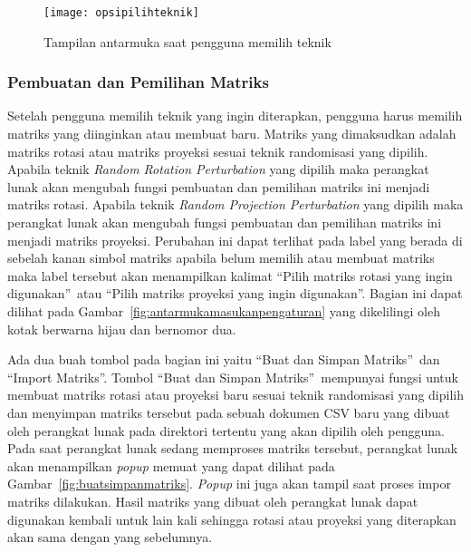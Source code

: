 \begin{figure}
	\centering
	\texttt{[image: opsipilihteknik]}
	\caption{Tampilan antarmuka saat pengguna memilih teknik}
	\label{fig:opsipilihteknik}
\end{figure}

\subsubsection{Pembuatan dan Pemilihan Matriks}
\label{subsubsec:pilihmatriks}

Setelah pengguna memilih teknik yang ingin diterapkan, pengguna harus memilih matriks yang diinginkan atau membuat baru. Matriks yang dimaksudkan adalah matriks rotasi atau matriks proyeksi sesuai teknik randomisasi yang dipilih. Apabila teknik \textit{Random Rotation Perturbation} yang dipilih maka perangkat lunak akan mengubah fungsi pembuatan dan pemilihan matriks ini menjadi matriks rotasi. Apabila teknik \textit{Random Projection Perturbation} yang dipilih maka perangkat lunak akan mengubah fungsi pembuatan dan pemilihan matriks ini menjadi matriks proyeksi. Perubahan ini dapat terlihat pada label yang berada di sebelah kanan simbol matriks apabila belum memilih atau membuat matriks maka label tersebut akan menampilkan kalimat \textquotedblleft Pilih matriks rotasi yang ingin digunakan\textquotedblright~atau \textquotedblleft Pilih matriks proyeksi yang ingin digunakan\textquotedblright. Bagian ini dapat dilihat pada Gambar~\ref{fig:antarmukamasukanpengaturan} yang dikelilingi oleh kotak berwarna hijau dan bernomor dua.

Ada dua buah tombol pada bagian ini yaitu \textquotedblleft Buat dan Simpan Matriks\textquotedblright~dan \textquotedblleft Import Matriks\textquotedblright. Tombol \textquotedblleft Buat dan Simpan Matriks\textquotedblright~mempunyai fungsi untuk membuat matriks rotasi atau proyeksi baru sesuai teknik randomisasi yang dipilih dan menyimpan matriks tersebut pada sebuah dokumen CSV baru yang dibuat oleh perangkat lunak pada direktori tertentu yang akan dipilih oleh pengguna. Pada saat perangkat lunak sedang memproses matriks tersebut, perangkat lunak akan menampilkan \textit{popup} memuat yang dapat dilihat pada Gambar~\ref{fig:buatsimpanmatriks}. \textit{Popup} ini juga akan tampil saat proses impor matriks dilakukan. Hasil matriks yang dibuat oleh perangkat lunak dapat digunakan kembali untuk lain kali sehingga rotasi atau proyeksi yang diterapkan akan sama dengan yang sebelumnya. 

